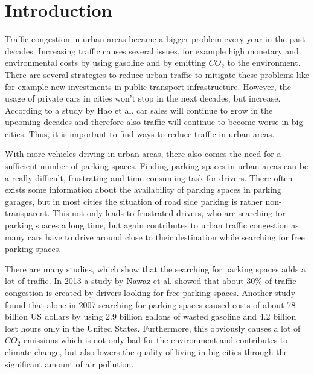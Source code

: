 \chapter{Introduction}
\label{sec:introduction}




Traffic congestion in urban areas became a bigger problem every year in the past decades. Increasing traffic causes several issues, for example high monetary and environmental costs by using gasoline and by emitting $CO_2$ to the environment. There are several strategies to reduce urban traffic to mitigate these problems like for example new investments in public transport infrastructure. However, the usage of private cars in cities won't stop in the next decades, but increase. According to a study by Hao et al. \cite{HAO2016121} car sales will continue to grow in the upcoming decades and therefore also traffic will continue to become worse in big cities. Thus, it is important to find ways to reduce traffic in urban areas.

With more vehicles driving in urban areas, there also comes the need for a sufficient number of parking spaces. Finding parking spaces in urban areas can be a really difficult, frustrating and time consuming task for drivers. There often exists some information about the availability of parking spaces in parking garages, but in most cities the situation of road side parking is rather non-transparent. This not only leads to frustrated drivers, who are searching for parking spaces a long time, but again contributes to urban traffic congestion as many cars have to drive around close to their destination while searching for free parking spaces. 

There are many studies, which show that the searching for parking spaces adds a lot of traffic. In 2013 a study by Nawaz et al. \cite{Nawaz:2013:PSB:2500423.2500438} showed that about 30\% of traffic congestion is created by drivers looking for free parking spaces. Another study \cite{TexasMobilityReport} found that alone in 2007 searching for parking spaces caused costs of about 78 billion US dollars by using 2.9 billion gallons of wasted gasoline and 4.2 billion lost hours only in the United States. Furthermore, this obviously causes a lot of $CO_2$ emissions which is not only bad for the environment and contributes to climate change, but also lowers the quality of living in big cities through the significant amount of air pollution.


